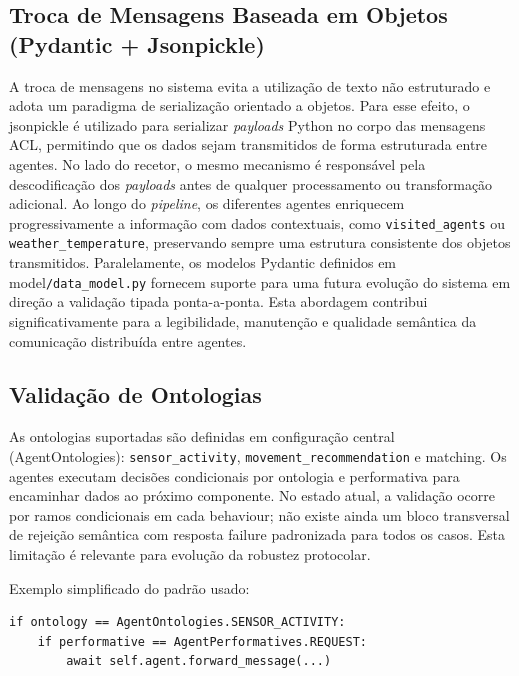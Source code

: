 \documentclass[runningheads]{llncs}
\begin{document}
\subsection{Troca de Mensagens Baseada em Objetos (Pydantic + Jsonpickle)}
A troca de mensagens no sistema evita a utilização de texto não estruturado e adota um paradigma de serialização orientado a objetos. Para esse efeito, o jsonpickle é utilizado para serializar \textit{payloads} Python no corpo das mensagens ACL, permitindo que os dados sejam transmitidos de forma estruturada entre agentes.  
No lado do recetor, o mesmo mecanismo é responsável pela descodificação dos \textit{payloads} antes de qualquer processamento ou transformação adicional. Ao longo do \textit{pipeline}, os diferentes agentes enriquecem progressivamente a informação com dados contextuais, como \texttt{visited\_agents} ou \texttt{weather\_temperature}, preservando sempre uma estrutura consistente dos objetos transmitidos.  
Paralelamente, os modelos Pydantic definidos em model\texttt{/data\_model.py} fornecem suporte para uma futura evolução do sistema em direção a validação tipada ponta-a-ponta. Esta abordagem contribui significativamente para a legibilidade, manutenção e qualidade semântica da comunicação distribuída entre agentes. 

\subsection{Validação de Ontologias}
As ontologias suportadas são definidas em configuração central (AgentOntologies): \texttt{sensor\_activity}, \texttt{movement\_recommendation} e matching.  
Os agentes executam decisões condicionais por ontologia e performativa para encaminhar dados ao próximo componente. No estado atual, a validação ocorre por ramos condicionais em cada behaviour; não existe ainda um bloco transversal de rejeição semântica com resposta failure padronizada para todos os casos. Esta limitação é relevante para evolução da robustez protocolar.

Exemplo simplificado do padrão usado:
\begin{lstlisting}
if ontology == AgentOntologies.SENSOR_ACTIVITY:
    if performative == AgentPerformatives.REQUEST:
        await self.agent.forward_message(...)
\end{lstlisting}
\end{document}
